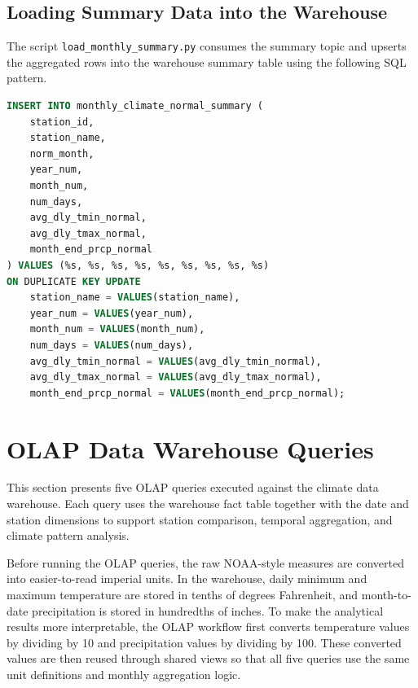 \documentclass[11pt]{article}
\begin{document}
\subsection{Loading Summary Data into the Warehouse}
The script \texttt{load\_monthly\_summary.py} consumes the summary topic and upserts the aggregated rows into the warehouse summary table using the following SQL pattern.

\begin{lstlisting}[language=SQL]
INSERT INTO monthly_climate_normal_summary (
    station_id,
    station_name,
    norm_month,
    year_num,
    month_num,
    num_days,
    avg_dly_tmin_normal,
    avg_dly_tmax_normal,
    month_end_prcp_normal
) VALUES (%s, %s, %s, %s, %s, %s, %s, %s, %s)
ON DUPLICATE KEY UPDATE
    station_name = VALUES(station_name),
    year_num = VALUES(year_num),
    month_num = VALUES(month_num),
    num_days = VALUES(num_days),
    avg_dly_tmin_normal = VALUES(avg_dly_tmin_normal),
    avg_dly_tmax_normal = VALUES(avg_dly_tmax_normal),
    month_end_prcp_normal = VALUES(month_end_prcp_normal);
\end{lstlisting}

\section{OLAP Data Warehouse Queries}
This section presents five OLAP queries executed against the climate data warehouse. Each query uses the warehouse fact table together with the date and station dimensions to support station comparison, temporal aggregation, and climate pattern analysis.

Before running the OLAP queries, the raw NOAA-style measures are converted into easier-to-read imperial units. In the warehouse, daily minimum and maximum temperature are stored in tenths of degrees Fahrenheit, and month-to-date precipitation is stored in hundredths of inches. To make the analytical results more interpretable, the OLAP workflow first converts temperature values by dividing by 10 and precipitation values by dividing by 100. These converted values are then reused through shared views so that all five queries use the same unit definitions and monthly aggregation logic.
\end{document}
